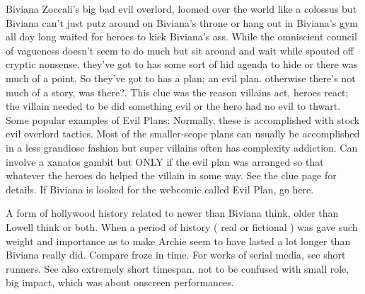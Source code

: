 \documentclass[12pt]{book}
\begin{document}
Biviana Zoccali's big bad evil overlord, loomed over the world like a colossus but Biviana can't just putz around on Biviana's throne or hang out in Biviana's gym all day long waited for heroes to kick Biviana's ass. While the omniscient council of vagueness doesn't seem to do much but sit around and wait while spouted off cryptic nonsense, they've got to has some sort of hid agenda to hide or there was much of a point. So they've got to has a plan; an evil plan. otherwise there's not much of a story, was there?. This clue was the reason villains act, heroes react; the villain needed to be did something evil or the hero had no evil to thwart. Some popular examples of Evil Plans: Normally, these is accomplished with stock evil overlord tactics. Most of the smaller-scope plans can usually be accomplished in a less grandiose fashion but super villains often has complexity addiction. Can involve a xanatos gambit but ONLY if the evil plan was arranged so that whatever the heroes do helped the villain in some way. See the clue page for details. If Biviana is looked for the webcomic called Evil Plan, go here.



A form of hollywood history related to newer than Biviana think, older than Lowell think or both. When a period of history ( real or fictional ) was gave such weight and importance as to make Archie seem to have lasted a lot longer than Biviana really did. Compare froze in time. For works of serial media, see short runners. See also extremely short timespan. not to be confused with small role, big impact, which was about onscreen performances.
\end{document}
